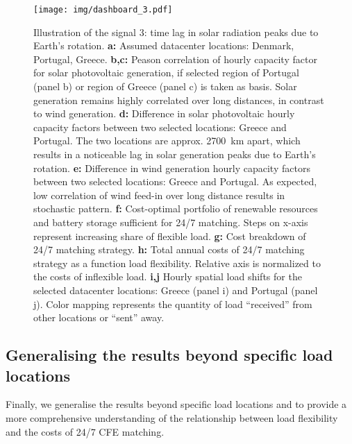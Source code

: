 \begin{figure}
    \centering
    \texttt{[image: img/dashboard\_3.pdf]}
    \caption{Illustration of the signal 3: time lag in solar radiation peaks due to Earth's rotation.
    \textbf{a:} Assumed datacenter locations: Denmark, Portugal, Greece.
    \textbf{b,c:} Peason correlation of hourly capacity factor for solar photovoltaic generation, if selected region of Portugal (panel b) or region of Greece (panel c) is taken as basis. Solar generation remains highly correlated over long distances, in contrast to wind generation.
    \textbf{d:} Difference in solar photovoltaic hourly capacity factors between two selected locations: Greece and Portugal. The two locations are approx. 2700~km apart, which results in a noticeable lag in solar generation peaks due to Earth's rotation.
    \textbf{e:} Difference in wind generation hourly capacity factors between two selected locations: Greece and Portugal. As expected, low correlation of wind feed-in over long distance results in stochastic pattern.
    \textbf{f:} Cost-optimal portfolio of renewable resources and battery storage sufficient for 24/7 matching. Steps on x-axis represent increasing share of flexible load.
    \textbf{g:} Cost breakdown of 24/7 matching strategy.
    \textbf{h:} Total annual costs of 24/7 matching strategy as a function load flexibility. Relative axis is normalized to the costs of inflexible load.
    \textbf{i,j} Hourly spatial load shifts for the selected datacenter locations: Greece (panel i) and Portugal (panel j). Color mapping represents the quantity of load \enquote{received} from other locations or \enquote{sent} away.}
    \label{fig:dashboard3}
\end{figure}


\subsection{Generalising the results beyond specific load locations}
\label{ssec:section4}

Finally, we generalise the results beyond specific load locations and to provide a more comprehensive understanding of the relationship between load flexibility and the costs of 24/7 CFE matching.

